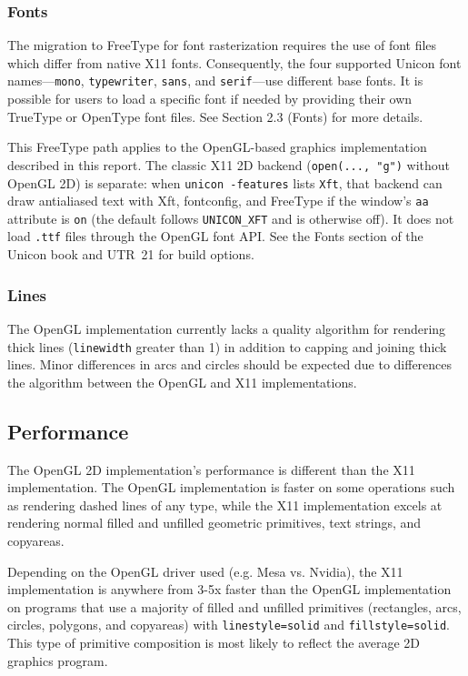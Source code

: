 \documentclass[letterpaper,12pt]{article}
\begin{document}
\subsubsection{Fonts}

The migration to FreeType for font rasterization requires the use of font files 
which differ from native X11 fonts. Consequently, the four supported Unicon 
font names---\texttt{mono}, \texttt{typewriter}, \texttt{sans}, and 
\texttt{serif}---use different base fonts. It is possible for users to load 
a specific font if needed by providing their own TrueType or OpenType font 
files. See Section 2.3 (Fonts) for more details.

This FreeType path applies to the OpenGL-based graphics implementation
described in this report. The classic X11 2D backend
(\texttt{open(..., "g")} without OpenGL 2D) is separate: when
\texttt{unicon -features} lists \texttt{Xft}, that backend can draw
antialiased text with Xft, fontconfig, and FreeType if the window's
\texttt{aa} attribute is \texttt{on} (the default follows
\texttt{UNICON\_XFT} and is otherwise off). It does not load
\texttt{.ttf} files through the OpenGL font API. See the Fonts
section of the Unicon book and UTR~21 for build options.

\subsubsection{Lines}

The OpenGL implementation currently lacks a quality algorithm for rendering
thick lines (\texttt{linewidth} greater than 1) in addition to capping
and joining thick lines. Minor differences in arcs and circles
should be expected due to differences the algorithm between the OpenGL and
X11 implementations.

\subsection{Performance}

The OpenGL 2D implementation's performance is different than the 
X11 implementation. The OpenGL implementation is faster on some operations
such as rendering dashed lines of any type, while the X11 implementation excels
at rendering normal filled and unfilled geometric primitives, text strings,
and copyareas. 

Depending on the OpenGL driver used (e.g. Mesa vs. Nvidia),
the X11 implementation is anywhere from 3-5x faster than the OpenGL
implementation on programs that use a majority of filled and unfilled
primitives (rectangles, arcs, circles, polygons, and copyareas) with
\texttt{linestyle=solid} and \texttt{fillstyle=solid}. This type of
primitive composition is most likely to reflect the average 2D graphics
program.
\end{document}
